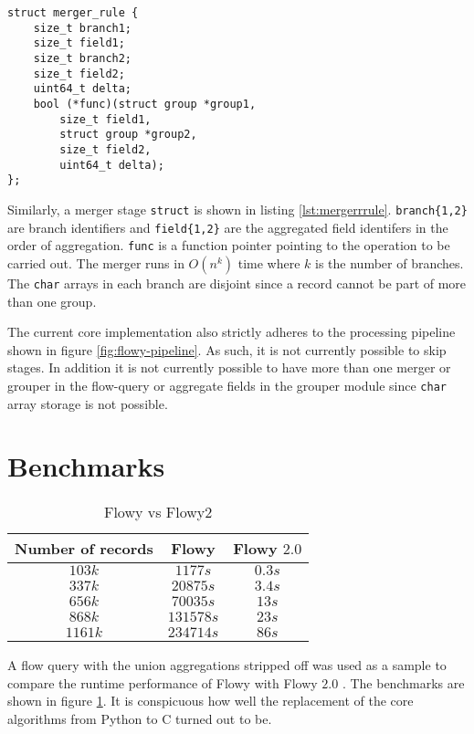 \begin{lstlisting}
struct merger_rule {
	size_t branch1;
	size_t field1;
	size_t branch2;
	size_t field2;
	uint64_t delta;
	bool (*func)(struct group *group1,
		size_t field1,
		struct group *group2,
		size_t field2,
		uint64_t delta);
};
\end{lstlisting}

Similarly, a merger stage \texttt{struct} is shown in listing \ref{lst:mergerrrule}. \texttt{branch\{1,2\}} are branch identifiers and \texttt{field\{1,2\}} are the aggregated field identifers in the order of aggregation. \texttt{func} is a function pointer pointing to the operation to be carried out. The merger  runs in $O(n^k)$ time where $k$ is the number of branches. The \texttt{char} arrays in each branch are disjoint since a record cannot be part of more than one group.

The current core implementation also strictly adheres to the processing pipeline shown in figure \ref{fig:flowy-pipeline}. As such, it is not currently possible to skip  stages. In addition it is not currently possible to have more than one merger or grouper in the flow-query or aggregate fields in the grouper module since \texttt{char} array storage is not possible. 

\section{Benchmarks}\label{sec:benchmarks}
\begin{table}[h!]
	\begin{center}
		\begin{tabular}{|c|c|c|}
		\hline	
		Number of records & Flowy & Flowy $2.0$ \\
		\hline
		\hline 
		$103k$ & $1177s$ & $0.3s$\\
		\hline 
		$337k$ & $20875s$ & $3.4s$\\
		\hline
		$656k$ & $70035s$ & $13s$\\
		\hline
		$868k$ & $131578s$ & $23s$\\
		\hline
		$1161k$ & $234714s$ & $86s$\\
		\hline
		\end{tabular}
	\end{center}
\caption{Flowy vs Flowy2 \cite{jschauer:thesis:2011}}
\label{tab:flowy2-benchmarks}
\end{table}
A flow query with the union aggregations stripped off was used as a sample to compare the runtime performance of Flowy \cite{kkanev:thesis:2009} with Flowy $2.0$  \cite{jschauer:thesis:2011}. The benchmarks are shown in figure \ref{tab:flowy2-benchmarks}. It is conspicuous how well the replacement of the core algorithms from Python to C turned out to be. 

